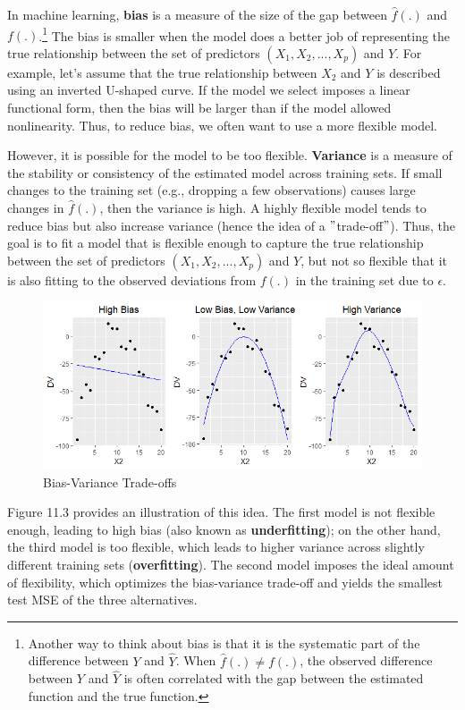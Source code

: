 \documentclass{book}
\begin{document}
In machine learning, \textbf{bias} is a measure of the size of the gap between
\(\hat{f}(.)\) and \({f}(.)\).\footnote{Another way to think about bias is
  that it is the systematic part of the difference between \(Y\) and
  \(\hat{Y}\). When \(\hat{f}(.)\neq{f}(.)\), the observed difference between
  \(Y\) and \(\hat{Y}\) is often correlated with the gap between the estimated
  function and the true function.} The bias is smaller when the model does a
better job of representing the true relationship between the set of predictors
\((X_{1},X_{2},...,X_{p})\) and \(Y\). For example, let's assume that the true
relationship between \(X_{2}\) and \(Y\) is described using an inverted
U-shaped curve. If the model we select imposes a linear functional form, then
the bias will be larger than if the model allowed nonlinearity. Thus, to
reduce bias, we often want to use a more flexible model.

However, it is possible for the model to be too flexible. \textbf{Variance} is
a measure of the stability or consistency of the estimated model across
training sets. If small changes to the training set (e.g., dropping a few
observations) causes large changes in \(\hat{f}(.)\), then the variance is
high. A highly flexible model tends to reduce bias but also increase variance
(hence the idea of a \("\)trade-off\("\)). Thus, the goal is to fit a model
that is flexible enough to capture the true relationship between the set of
predictors \((X_{1},X_{2},...,X_{p})\) and \(Y\), but not so flexible that it
is also fitting to the observed deviations from \({f}(.)\) in the training set
due to \(\epsilon\).

\begin{figure}
\centering
\includegraphics{images/ml/jl-figure3.png}
\caption{Bias-Variance Trade-offs}
\end{figure}

Figure 11.3 provides an illustration of this idea. The first model is not
flexible enough, leading to high bias (also known as \textbf{underfitting});
on the other hand, the third model is too flexible, which leads to higher
variance across slightly different training sets (\textbf{overfitting}). The
second model imposes the ideal amount of flexibility, which optimizes the
bias-variance trade-off and yields the smallest test MSE of the three
alternatives.
\end{document}
